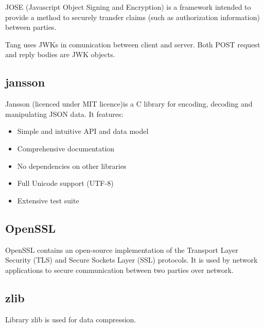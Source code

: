 \documentclass[../xdudla00-porting-Tang-to-Open-WRT.tex]{subfiles}
\begin{document}
JOSE (Javascript Object Signing and Encryption) is a framework intended to provide a method to securely transfer claims (such as authorization information) between parties.

Tang uses JWKs in comunication between client and server. Both POST request and reply bodies are JWK objects.

\subsection{jansson}\label{jansson}
Jansson \cite{jansson}(licenced under MIT licence)is a C library for encoding, decoding and manipulating JSON data. It features:
\begin{itemize}

    \item Simple and intuitive API and data model
    \item Comprehensive documentation
    \item No dependencies on other libraries
    \item Full Unicode support (UTF-8)
    \item Extensive test suite
\end{itemize}

\subsection{OpenSSL}\label{openssl}
OpenSSL \cite{openssl} contains an open-source implementation of the Transport Layer Security (TLS) and Secure Sockets Layer (SSL) protocols. It is used by network applications to secure communication between two parties over network.


\subsection{zlib}\label{zlib}
Library zlib \cite{zlib} is used for data compression.
\end{document}
